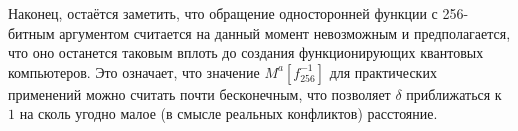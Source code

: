 Наконец, остаётся заметить, что обращение односторонней функции с 256-битным аргументом считается на данный момент невозможным и предполагается, что оно останется таковым вплоть до создания функционирующих квантовых компьютеров. Это означает, что значение $M^a[f_{256}^{-1}]$ для практических применений можно считать почти бесконечным, что позволяет $\delta$ приближаться к $1$ на сколь угодно малое (в смысле реальных конфликтов) расстояние.

%	
